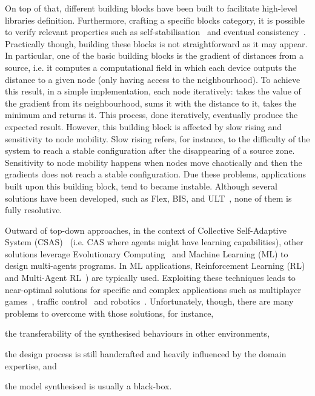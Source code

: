 \documentclass[conference]{IEEEtran}
\begin{document}
%
On top of that, different building blocks have been built to facilitate high-level libraries definition.
%
Furthermore, crafting a specific blocks category, it is possible to verify relevant properties such as self-stabilisation~\cite{DBLP:conf/coordination/ViroliD14} and eventual consistency~\cite{DBLP:conf/saso/BealVPD16}.
%
Practically though, building these blocks is not straightforward as it may appear. 
%
In particular, one of the basic building blocks is the gradient of distances from a source, i.e. it computes a computational field in which each device outputs the distance to a given node (only having access to the neighbourhood).
%
To achieve this result, in a simple implementation, each node iteratively: takes the value of the gradient from its neighbourhood, sums it with the distance to it, takes the minimum and returns it.
%
This process, done iteratively, eventually produce the expected result.
%
However, this building block is affected by slow rising and 
sensitivity to node mobility.
%
Slow rising refers, for instance, to the difficulty of the system to reach a stable configuration after the disappearing of a source zone.
%
Sensitivity to node mobility happens when nodes move chaotically and then the gradients does not reach a stable configuration.
%
Due these problems, applications built upon this building block, tend to became instable.
%
Although several solutions have been developed, such as Flex, BIS, and ULT~\cite{DBLP:conf/saso/AudritoCDV17}, none of them is fully resolutive.

Outward of top-down approaches, in the context of Collective Self-Adaptive System (CSAS)~\cite{DBLP:conf/metacognition/Mitchell05} (i.e. CAS where agents might have learning capabilities), other solutions leverage Evolutionary Computing~\cite{DBLP:journals/swarm/BrambillaFBD13} and Machine Learning (ML) to design multi-agents programs. 
%
In ML applications, Reinforcement Learning (RL)~\cite{DBLP:journals/access/NaeemRC20} and Multi-Agent RL~\cite{DBLP:journals/tcyb/NguyenNN20}) are typically  used.
%
Exploiting these techniques leads to near-optimal solutions for specific and complex applications such as multiplayer games~\cite{DBLP:journals/nature/VinyalsBCMDCCPE19, DBLP:journals/taas/HaoLM15}, traffic control~\cite{DBLP:journals/aes/JinMK17, DBLP:conf/icac/SteinTRH16} and robotics~\cite{DBLP:journals/taas/KraemerB14}.
%
Unfortunately, though, there are many problems to overcome with those solutions, for instance,
\begin{enumerate*}[label=(\roman*)]
    \item the transferability of the synthesised behaviours in other environments, 
    \item the design process is still handcrafted and heavily influenced by the domain expertise, and
    \item the model synthesised is usually a black-box.
\end{enumerate*}
\end{document}
